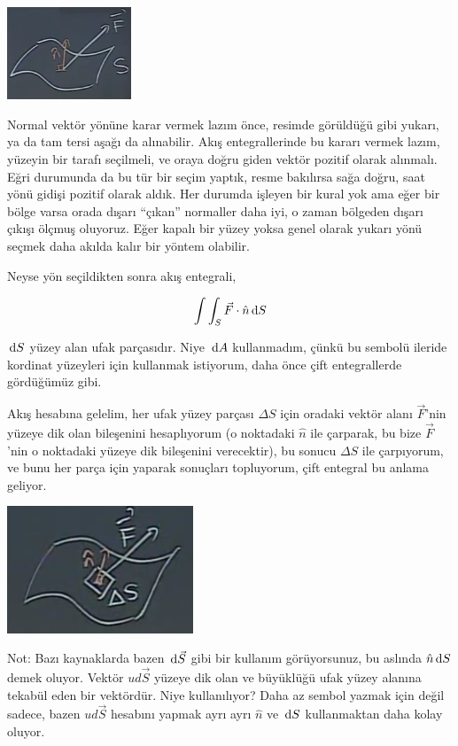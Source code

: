\documentclass[12pt,fleqn]{article}\usepackage{../../common}
\begin{document}
\includegraphics[width=10em]{calc_multi_27_03.png}

Normal vektör yönüne karar vermek lazım önce, resimde görüldüğü gibi yukarı, ya
da tam tersi aşağı da alınabilir. Akış entegrallerinde bu kararı vermek lazım,
yüzeyin bir tarafı seçilmeli, ve oraya doğru giden vektör pozitif olarak
alınmalı. Eğri durumunda da bu tür bir seçim yaptık, resme bakılırsa sağa doğru,
saat yönü gidişi pozitif olarak aldık. Her durumda işleyen bir kural yok ama
eğer bir bölge varsa orada dışarı ``çıkan'' normaller daha iyi, o zaman bölgeden
dışarı çıkışı ölçmuş oluyoruz.  Eğer kapalı bir yüzey yoksa genel olarak yukarı
yönü seçmek daha akılda kalır bir yöntem olabilir.

Neyse yön seçildikten sonra akış entegrali,

$$
\int \int_S \vec{F} \cdot \hat{n} \,\mathrm{d} S
$$

$\,\mathrm{d} S$ yüzey alan ufak parçasıdır. Niye $\,\mathrm{d} A$ kullanmadım, çünkü bu
sembolü ileride kordinat yüzeyleri için kullanmak istiyorum, daha önce
çift entegrallerde gördüğümüz gibi.

Akış hesabına gelelim, her ufak yüzey parçası $\Delta S$ için oradaki vektör
alanı $\vec{F}$'nin yüzeye dik olan bileşenini hesaplıyorum (o noktadaki
$\hat{n}$ ile çarparak, bu bize $\vec{F}$'nin o noktadaki yüzeye dik bileşenini
verecektir), bu sonucu $\Delta S$ ile çarpıyorum, ve bunu her parça için
yaparak sonuçları topluyorum, çift entegral bu anlama geliyor.


\includegraphics[width=15em]{calc_multi_27_04.png}

Not: Bazı kaynaklarda bazen $\,\mathrm{d} \vec{S}$ gibi bir kullanım görüyorsunuz,
bu aslında $\hat{n} \,\mathrm{d} S$ demek oluyor. Vektör $ud \vec{S}$ yüzeye dik
olan ve büyüklüğü ufak yüzey alanına tekabül eden bir vektördür. Niye
kullanılıyor? Daha az sembol yazmak için değil sadece, bazen $ud \vec{S}$
hesabını yapmak ayrı ayrı $\hat{n}$ ve $\,\mathrm{d} S$ kullanmaktan daha
kolay oluyor.
\end{document}
